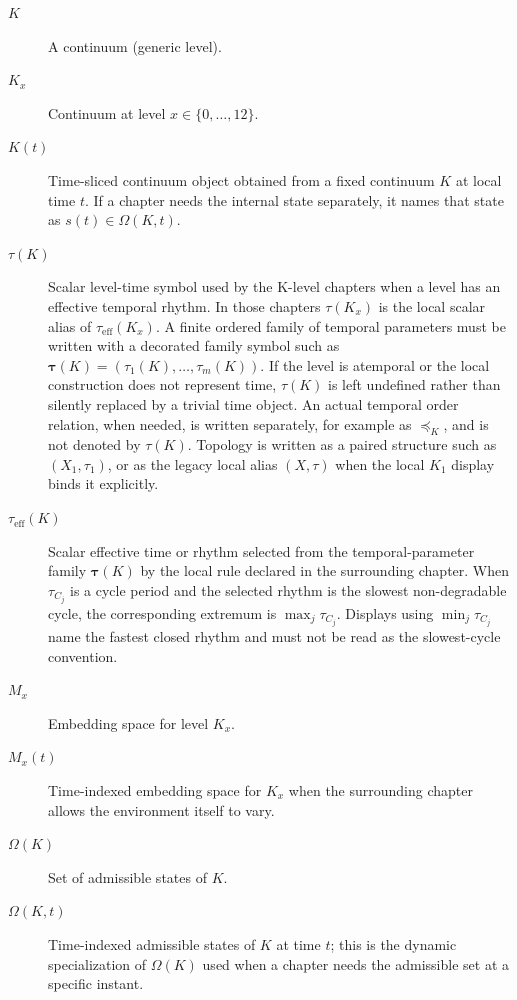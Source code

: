 \begin{description}
  \item[\(K\)] A continuum (generic level).
  \item[\(K_x\)] Continuum at level \(x\in\{0,\dots,12\}\).
  \item[\(K(t)\)] Time-sliced continuum object obtained from a fixed continuum
        \(K\) at local time \(t\). If a chapter needs the internal state
        separately, it names that state as \(s(t)\in\Omega(K,t)\).
  \item[\(\tau(K)\)] Scalar level-time symbol used by the K-level chapters when
        a level has an effective temporal rhythm. In those chapters
        \(\tau(K_x)\) is the local scalar alias of
        \(\tau_{\mathrm{eff}}(K_x)\). A finite ordered family of temporal
        parameters must be written with a decorated family symbol such as
        \(\boldsymbol{\tau}(K)=(\tau_1(K),\dots,\tau_m(K))\). If the level is
        atemporal or the local construction does not represent time,
        \(\tau(K)\) is left undefined rather than silently replaced by a trivial
        time object. An actual temporal order relation, when needed, is written
        separately, for example as \(\preceq_K\), and is not denoted by
        \(\tau(K)\). Topology is written as a paired structure such as
        \((X_1,\tau_1)\), or as the legacy local alias \((X,\tau)\) when the
        local \(K_1\) display binds it explicitly.
  \item[\(\tau_{\mathrm{eff}}(K)\)] Scalar effective time or rhythm selected
        from the temporal-parameter family \(\boldsymbol{\tau}(K)\) by the local rule
        declared in the surrounding chapter. When \(\tau_{C_j}\) is a cycle
        period and the selected rhythm is the slowest non-degradable cycle, the
        corresponding extremum is \(\max_j\tau_{C_j}\). Displays using
        \(\min_j\tau_{C_j}\) name the fastest closed rhythm and must not be read
        as the slowest-cycle convention.
  \item[\(M_x\)] Embedding space for level \(K_x\).
  \item[\(M_x(t)\)] Time-indexed embedding space for \(K_x\) when the
        surrounding chapter allows the environment itself to vary.
  \item[\(\Omega(K)\)] Set of admissible states of \(K\).
  \item[\(\Omega(K,t)\)] Time-indexed admissible states of \(K\) at time
        \(t\); this is the dynamic specialization of \(\Omega(K)\) used when a
        chapter needs the admissible set at a specific instant.

\end{description}
